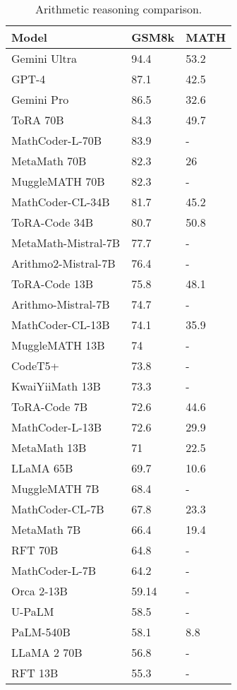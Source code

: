 \documentclass[conference]{IEEEtran}
\begin{document}
\begin{table}[H]
    \centering
    \caption{Arithmetic reasoning comparison.} \label{tab:arithmetic}
    \begin{tabular}{|l|l|l|}
    \hline
        Model & GSM8k & MATH \\ \hline
Gemini Ultra & 94.4 & 53.2 \\ \hline
GPT-4 & 87.1 & 42.5 \\ \hline
Gemini Pro & 86.5 & 32.6 \\ \hline
ToRA 70B & 84.3 & 49.7 \\ \hline
MathCoder-L-70B & 83.9 & - \\ \hline
MetaMath 70B & 82.3 & 26 \\ \hline
MuggleMATH 70B & 82.3 & - \\ \hline
MathCoder-CL-34B & 81.7 & 45.2 \\ \hline
ToRA-Code 34B & 80.7 & 50.8 \\ \hline
MetaMath-Mistral-7B & 77.7 & - \\ \hline
Arithmo2-Mistral-7B & 76.4 & - \\ \hline
ToRA-Code 13B & 75.8 & 48.1 \\ \hline
Arithmo-Mistral-7B & 74.7 & - \\ \hline
MathCoder-CL-13B & 74.1 & 35.9 \\ \hline
MuggleMATH 13B & 74 & - \\ \hline
CodeT5+ & 73.8 & - \\ \hline
KwaiYiiMath 13B & 73.3 & - \\ \hline
ToRA-Code 7B & 72.6 & 44.6 \\ \hline
MathCoder-L-13B & 72.6 & 29.9 \\ \hline
MetaMath 13B & 71 & 22.5 \\ \hline
LLaMA 65B & 69.7 & 10.6 \\ \hline
MuggleMATH 7B & 68.4 & - \\ \hline
MathCoder-CL-7B & 67.8 & 23.3 \\ \hline
MetaMath 7B & 66.4 & 19.4 \\ \hline
RFT 70B & 64.8 & - \\ \hline
MathCoder-L-7B & 64.2 & - \\ \hline
Orca 2-13B & 59.14 & - \\ \hline
U-PaLM & 58.5 & - \\ \hline
PaLM-540B & 58.1 & 8.8 \\ \hline
LLaMA 2 70B & 56.8 & - \\ \hline
RFT 13B & 55.3 & - \\ \hline

\end{tabular}
\end{table}
\end{document}
